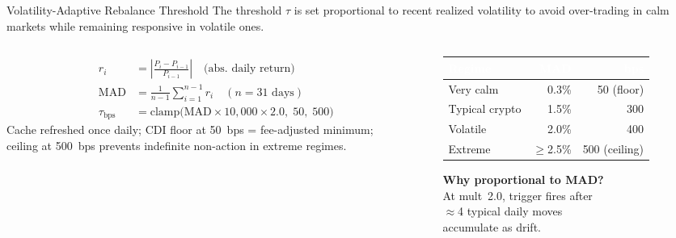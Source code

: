 \documentclass[aspectratio=169,10pt]{beamer}
\begin{document}
\begin{frame}{Volatility-Adaptive Rebalance Threshold}
\vspace{0.1em}
{\small\color{BodyText}
The threshold $\tau$ is set proportional to recent realized volatility to avoid
over-trading in calm markets while remaining responsive in volatile ones.}

\vspace{0.2em}
\small
\begin{columns}[T]
\begin{column}{0.52\textwidth}
\begin{align*}
  r_i &= \left|\frac{P_i - P_{i-1}}{P_{i-1}}\right|
    \quad\text{(abs. daily return)} \\[0.3em]
  \text{MAD} &= \frac{1}{n{-}1}\sum_{i=1}^{n-1} r_i
    \quad (n{=}31\text{ days}) \\[0.3em]
  \tau_{\text{bps}} &= \text{clamp}\bigl(
    \text{MAD}{\times}10{,}000{\times}2.0,\;50,\;500\bigr)
\end{align*}
\vspace{0.2em}
{\scriptsize\color{MutedText}
Cache refreshed once daily; CDI floor at 50~bps = fee-adjusted minimum;\\
ceiling at 500~bps prevents indefinite non-action in extreme regimes.}
\end{column}
\begin{column}{0.44\textwidth}
\vspace{0.2em}
\begin{tabular}{@{}l r r@{}}
\toprule
\rowcolor{Navy}
  \textcolor{white}{\textbf{Regime}} &
  \textcolor{white}{\textbf{MAD}} &
  \textcolor{white}{\textbf{bps}} \\
\midrule
Very calm      & 0.3\% & 50  (floor) \\
Typical crypto & 1.5\% & 300 \\
Volatile       & 2.0\% & 400 \\
Extreme        & $\geq$2.5\% & 500 (ceiling) \\
\bottomrule
\end{tabular}
\vspace{0.2em}

{\scriptsize\color{MutedText}
\textbf{Why proportional to MAD?}\\
At mult~2.0, trigger fires after\\
$\approx$4 typical daily moves\\
accumulate as drift.}
\end{column}
\end{columns}
\end{frame}
\end{document}
